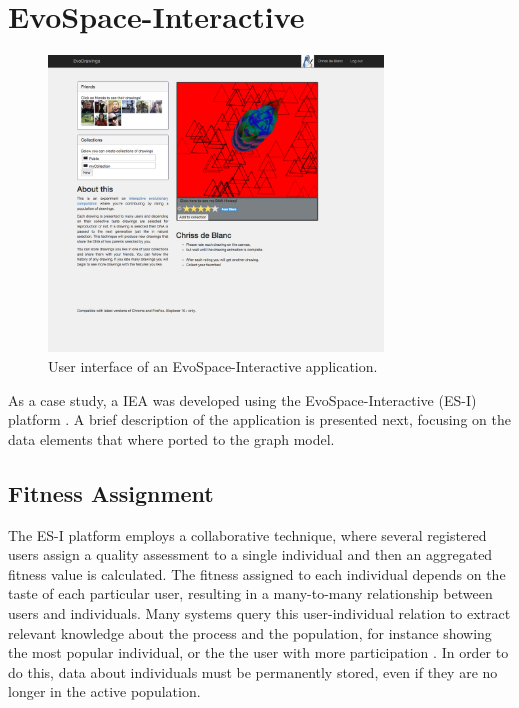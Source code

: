 \documentclass[conference]{IEEEtran}
\begin{document}
\section{EvoSpace-Interactive}
\label{sec:evospace-i}
\begin{figure}[!t]
    \centering
        \includegraphics[width=3.5in]{img/UI_ed01.png}
    \caption{User interface of an EvoSpace-Interactive application.}
    \label{fig:web}
\end{figure}

As a case study, a IEA was developed using the 
EvoSpace-Interactive (ES-I) platform \cite{garcia2013evospace}. %
A brief description of the application is presented next, focusing
on the data elements that where ported to the graph model.

\subsection{Fitness Assignment}
\label{sec:assignment}
The ES-I platform employs a collaborative technique,
where several registered users assign a quality assessment to a single
individual and then an aggregated fitness value is calculated. The fitness
assigned to each individual depends on the taste of each particular user, 
resulting in a many-to-many relationship between users and individuals. 
Many systems query this user-individual relation to extract relevant
knowledge about the process and the population, for instance showing the
most popular individual, or the the user with more participation 
\cite{picbreeder}.
In order to do this, data about individuals 
must be permanently stored, even
if they are no longer in the active population. 
\end{document}
